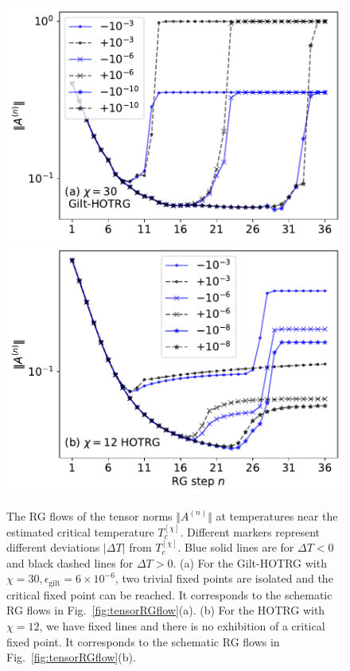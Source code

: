 \documentclass[aps,prb,reprint,superscriptaddress,floatfix]{revtex4-2}
\begin{document}
\begin{figure}[htb]
    \includegraphics[width=\columnwidth]{./figures/AnormFlow-a.pdf}
    \includegraphics[width=\columnwidth]{./figures/AnormFlow-b.pdf}
    \caption{\label{fig:flowAnorm}The RG flows of the tensor norms $\Vert
    A^{(n)} \Vert$ at temperatures near the estimated critical
temperature $T_c^{[\chi]}$. Different markers represent different
deviations $| \Delta T| $ from $T_c^{[\chi]}$. Blue solid lines are for
$\Delta T<0$ and black dashed lines for $\Delta T>0$. (a) For the
Gilt-HOTRG with $\chi = 30,\epsilon_{\text{gilt}} = 6\times 10^{-6}$,
two trivial fixed points are isolated and the critical fixed point can
be reached. It corresponds to the schematic RG flows in
Fig.~\ref{fig:tensorRGflow}(a). (b) For the HOTRG with $\chi = 12$, we
have fixed lines and there is no exhibition of a critical fixed point.
It corresponds to the schematic RG flows in
Fig.~\ref{fig:tensorRGflow}(b).}
\end{figure}
%
\end{document}
